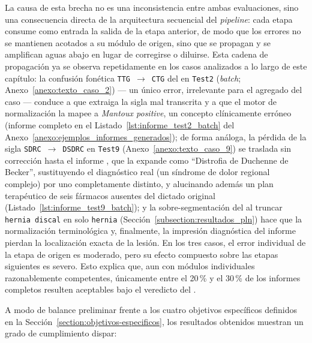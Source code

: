 La causa de esta brecha no es una inconsistencia entre ambas evaluaciones, sino una consecuencia
directa de la arquitectura secuencial del \textit{pipeline}: cada etapa consume como entrada la
salida de la etapa anterior, de modo que los errores no se mantienen acotados
a su módulo de origen, sino que se propagan y se amplifican aguas abajo en lugar de corregirse o
diluirse. Esta cadena de propagación ya se observa repetidamente en los casos
analizados a lo largo de este capítulo: la confusión fonética \texttt{TTG}~$\rightarrow$~\texttt{CTG}
del  en \texttt{Test2} (\textit{batch}; Anexo~\ref{anexo:texto_caso_2}) --- un único error, irrelevante para el
 agregado del caso --- conduce a que  extraiga la sigla mal
transcrita y a que el motor de normalización la mapee a \textit{Mantoux positive}, un concepto
 clínicamente erróneo (informe completo en el
Listado~\ref{lst:informe_test2_batch} del Anexo~\ref{anexo:ejemplos_informes_generados}); de forma
análoga, la pérdida de la sigla
\texttt{SDRC}~$\rightarrow$~\texttt{DSDRC} en \texttt{Test9} (Anexo~\ref{anexo:texto_caso_9}) se traslada sin corrección hasta el
informe , que la expande como ``Distrofia de Duchenne de Becker'', sustituyendo el
diagnóstico real (un síndrome de dolor regional complejo) por uno completamente distinto, y
alucinando además un plan terapéutico de seis fármacos ausentes del dictado original (Listado~\ref{lst:informe_test9_batch}); y la
sobre-segmentación del  al truncar \texttt{hernia discal} en solo \texttt{hernia}
(Sección~\ref{subsection:resultados_pln}) hace que la normalización terminológica y, finalmente, la
impresión diagnóstica del informe pierdan la localización exacta de la lesión. En los tres casos, el
error individual de la etapa de origen es moderado, pero su efecto compuesto sobre las etapas
siguientes es severo. Esto explica que, aun con
módulos individuales razonablemente competentes, únicamente entre el 20\,\% y el 30\,\% de los
informes completos resulten aceptables bajo el veredicto del .

A modo de balance preliminar frente a los cuatro objetivos específicos definidos en la
Sección~\ref{section:objetivos-especificos}, los resultados obtenidos muestran un grado de cumplimiento dispar:

